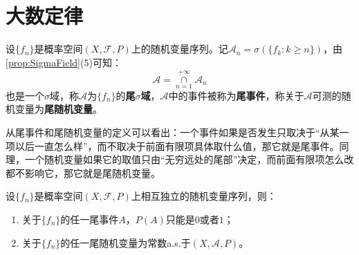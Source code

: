 \section{大数定律}

\begin{definition}
	设$\{f_n\}$是概率空间$(X,\mathscr{F},P)$上的随机变量序列。记$\mathscr{A}_n=\sigma(\{f_k:k\geqslant n\})$，由\cref{prop:SigmaField}(5)可知：
	\begin{equation*}
		\mathscr{A}=\underset{n=1}{\overset{+\infty}{\cap}}\mathscr{A}_n
	\end{equation*}
	也是一个$\sigma$域，称$\mathscr{A}$为$\{f_n\}$的\textbf{尾$\sigma$域}，$\mathscr{A}$中的事件被称为\textbf{尾事件}，称关于$\mathscr{A}$可测的随机变量为\textbf{尾随机变量}。
\end{definition}
\begin{note}
	从尾事件和尾随机变量的定义可以看出：一个事件如果是否发生只取决于“从某一项以后一直怎么样”，而不取决于前面有限项具体取什么值，那它就是尾事件。同理，一个随机变量如果它的取值只由“无穷远处的尾部”决定，而前面有限项怎么改都不影响它，那它就是尾随机变量。
\end{note}
\begin{theorem}\label{theo:01Law}
	设$\{f_n\}$是概率空间$(X,\mathscr{F},P)$上相互独立的随机变量序列，则：
	\begin{enumerate}
		\item 关于$\{f_n\}$的任一尾事件$A$，$P(A)$只能是$0$或者$1$；
		\item 关于$\{f_n\}$的任一尾随机变量为常数a.s.于$(X,\mathscr{A},P)$。
	\end{enumerate}
\end{theorem}
